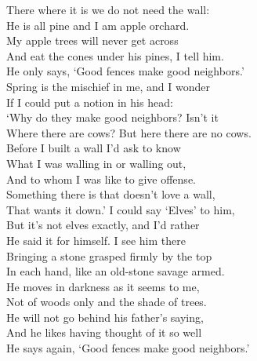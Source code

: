 \documentclass[10pt,twocolumn,a4paper]{article}
\begin{document}
There where it is we do not need the wall:\\
He is all pine and I am apple orchard.\\
My apple trees will never get across\\
And eat the cones under his pines, I tell him.\\
He only says, ‘Good fences make good neighbors.’\\
Spring is the mischief in me, and I wonder\\
If I could put a notion in his head:\\
‘Why do they make good neighbors? Isn’t it\\
Where there are cows? But here there are no cows.\\
Before I built a wall I’d ask to know\\
What I was walling in or walling out,\\
And to whom I was like to give offense.\\
Something there is that doesn’t love a wall,\\
That wants it down.’ I could say ‘Elves’ to him,\\
But it’s not elves exactly, and I’d rather\\
He said it for himself. I see him there\\
Bringing a stone grasped firmly by the top\\
In each hand, like an old-stone savage armed.\\
He moves in darkness as it seems to me,\\
Not of woods only and the shade of trees.\\
He will not go behind his father’s saying,\\
And he likes having thought of it so well\\
He says again, ‘Good fences make good neighbors.’
\end{document}
